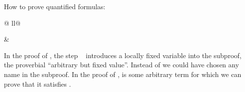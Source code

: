 \begin{isabellebody}
\begin{isamarkuptext}
How to prove quantified formulas:
\end{isamarkuptext}%
\begin{tabular}{@ {}ll@ {}}
\begin{minipage}[t]{.4\textwidth}
\end{minipage}
&
\begin{minipage}[t]{.4\textwidth}
\end{minipage}
\end{tabular}
\medskip
\begin{isamarkuptext}%
In the proof of ,
the step ~ introduces a locally fixed variable 
into the subproof, the proverbial ``arbitrary but fixed value''.
Instead of  we could have chosen any name in the subproof.
In the proof of ,
 is some arbitrary
term for which we can prove that it satisfies .


\end{isamarkuptext}
\end{isabellebody}
